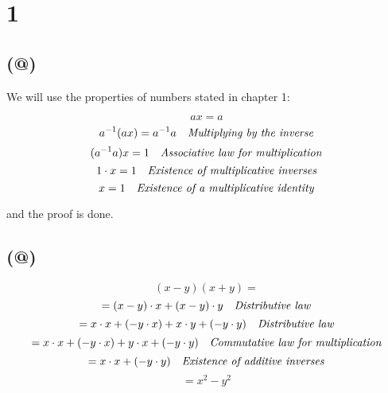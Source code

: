 \documentclass{article}
\makeatletter
\newcommand*{\rom}[1]{\expandafter\@slowromancap\romannumeral #1@}
\makeatother
\begin{document}
\section*{1}

\subsection*{(\rom{1})}

We will use the properties of numbers stated in chapter 1:

\begin{equation*}
	ax = a
\end{equation*}
\begin{equation*}
	a^{-1}(ax) = a^{-1}a \ \ \ \mbox{\emph{Multiplying by the inverse}}	
\end{equation*}
\begin{equation*}
	(a^{-1}a)x = 1  \ \ \ \mbox{\emph{Associative law for multiplication}}
\end{equation*}
\begin{equation*}
	1 \cdot x = 1  \ \ \ \mbox{\emph{Existence of multiplicative inverses}}
\end{equation*}
\begin{equation*}
	x = 1  \ \ \ \mbox{\emph{Existence of a multiplicative identity}}
\end{equation*}

and the proof is done.


\subsection*{(\rom{2})}

\begin{equation*}
	(x-y)(x+y) =
\end{equation*}
\begin{equation*}
	=(x-y) \cdot x + (x-y) \cdot y \ \ \ \mbox{\emph{Distributive law}}
\end{equation*}
\begin{equation*}
	=x \cdot x + (-y \cdot x) + x \cdot y + (-y \cdot y) \ \ \
	\mbox{\emph{Distributive law}}
\end{equation*}
\begin{equation*}
	=x \cdot x + (-y \cdot x) + y \cdot x + (-y \cdot y)  \ \ \
	\mbox{\emph{Commutative law for multiplication}}
\end{equation*}
\begin{equation*}
	=x \cdot x +  (-y \cdot y) \ \ \
	\mbox{\emph{Existence of additive inverses}}
\end{equation*}
\begin{equation*}
	= x^2 - y^2
\end{equation*}
\end{document}
